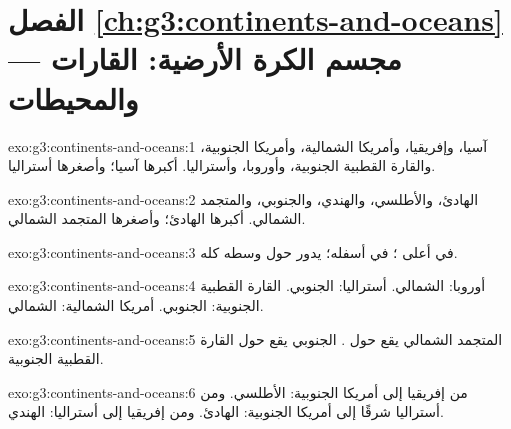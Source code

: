 \section*{الفصل \ref{ch:g3:continents-and-oceans} --- مجسم الكرة الأرضية: القارات والمحيطات}

\begin{solution}{exo:g3:continents-and-oceans:1}
آسيا، وإفريقيا، وأمريكا الشمالية، وأمريكا الجنوبية، والقارة القطبية الجنوبية، وأوروبا،
وأستراليا. أكبرها آسيا؛ وأصغرها أستراليا.
\end{solution}

\begin{solution}{exo:g3:continents-and-oceans:2}
 الهادئ، والأطلسي، والهندي، والجنوبي، والمتجمد الشمالي.
أكبرها  الهادئ؛ وأصغرها  المتجمد الشمالي.
\end{solution}

\begin{solution}{exo:g3:continents-and-oceans:3}
 في أعلى ؛  في أسفله؛
 يدور حول وسطه كله.
\end{solution}

\begin{solution}{exo:g3:continents-and-oceans:4}
أوروبا: الشمالي. أستراليا: الجنوبي. القارة القطبية الجنوبية: الجنوبي. أمريكا الشمالية:
الشمالي.
\end{solution}

\begin{solution}{exo:g3:continents-and-oceans:5}
 المتجمد الشمالي يقع حول .  الجنوبي يقع حول
القارة القطبية الجنوبية.
\end{solution}

\begin{solution}{exo:g3:continents-and-oceans:6}
من إفريقيا إلى أمريكا الجنوبية:  الأطلسي. ومن أستراليا شرقًا إلى
أمريكا الجنوبية:  الهادئ. ومن إفريقيا إلى أستراليا: 
الهندي.
\end{solution}


